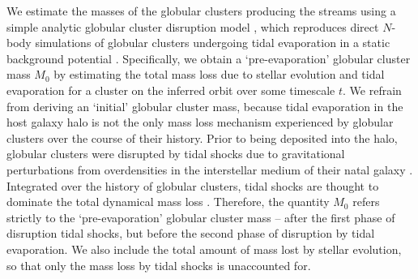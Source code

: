 \documentclass[twocolumn]{aastex63}
\begin{document}
We estimate the masses of the globular clusters producing the streams using a simple analytic globular cluster disruption model \citep{lamers05}, which reproduces direct $N$-body simulations of globular clusters undergoing tidal evaporation in a static background potential \citep{baumgardt03}. Specifically, we obtain a `pre-evaporation' globular cluster mass $M_0$ by estimating the total mass loss due to stellar evolution and tidal evaporation for a cluster on the inferred orbit over some timescale $t$. We refrain from deriving an `initial' globular cluster mass, because tidal evaporation in the host galaxy halo is not the only mass loss mechanism experienced by globular clusters over the course of their history. Prior to being deposited into the halo, globular clusters were disrupted by tidal shocks due to gravitational perturbations from overdensities in the interstellar medium of their natal galaxy \citep[e.g.][]{gieles06,kruijssen11,miholics17,pfeffer18}. Integrated over the history of globular clusters, tidal shocks are thought to dominate the total dynamical mass loss \citep[e.g.][]{kruijssen15b}. Therefore, the quantity $M_0$ refers strictly to the `pre-evaporation' globular cluster mass -- after the first phase of disruption tidal shocks, but before the second phase of disruption by tidal evaporation. We also include the total amount of mass lost by stellar evolution, so that only the mass loss by tidal shocks is unaccounted for.
\end{document}
